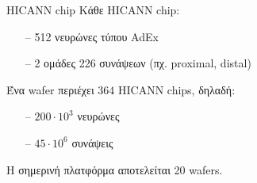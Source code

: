 \documentclass[11pt,center]{beamer}
\begin{document}
	\begin{frame} {HICANN chip}
		Κάθε HICANN chip:
		\begin{itemize}
			\item[--] 512 νευρώνες τύπου AdEx
			\item[--] 2 ομάδες 226 συνάψεων (πχ. proximal, distal)
		\end{itemize}
		\pause
		\vfill
		Ένα wafer περιέχει $364$ HICANN chips, δηλαδή:
		\begin{itemize}
			\item[--] $200\cdot 10^3$ νευρώνες
			\item[--]$45\cdot 10^6$ συνάψεις
		\end{itemize}
		\pause
		\vfill
		Η σημερινή πλατφόρμα αποτελείται 20 wafers.

	\end{frame}
\end{document}
